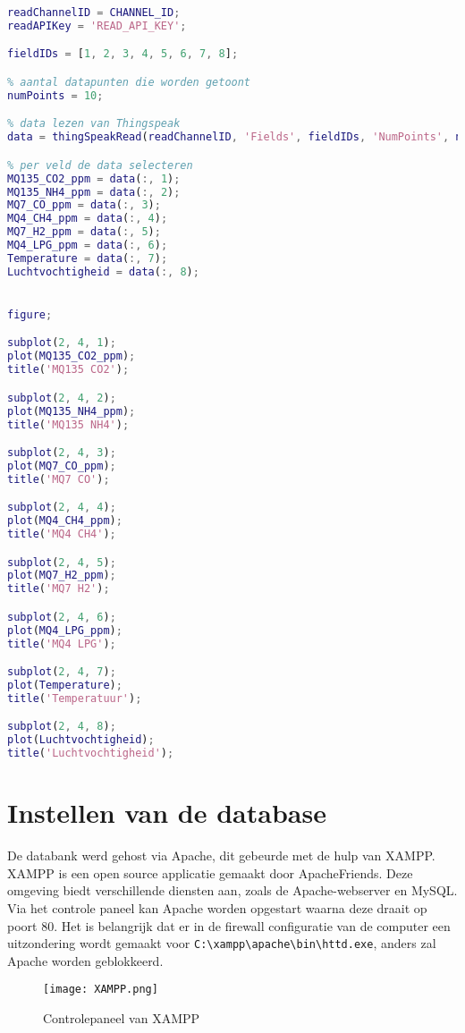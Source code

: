 \begin{lstlisting}[language=Matlab,caption={Visualisatie in matlab}]
readChannelID = CHANNEL_ID;
readAPIKey = 'READ_API_KEY';

fieldIDs = [1, 2, 3, 4, 5, 6, 7, 8];

% aantal datapunten die worden getoont
numPoints = 10;

% data lezen van Thingspeak
data = thingSpeakRead(readChannelID, 'Fields', fieldIDs, 'NumPoints', numPoints, 'ReadKey', readAPIKey);

% per veld de data selecteren
MQ135_CO2_ppm = data(:, 1);
MQ135_NH4_ppm = data(:, 2);
MQ7_CO_ppm = data(:, 3);
MQ4_CH4_ppm = data(:, 4);
MQ7_H2_ppm = data(:, 5);
MQ4_LPG_ppm = data(:, 6);
Temperature = data(:, 7);
Luchtvochtigheid = data(:, 8);


figure;

subplot(2, 4, 1);
plot(MQ135_CO2_ppm);
title('MQ135 CO2');

subplot(2, 4, 2);
plot(MQ135_NH4_ppm);
title('MQ135 NH4');

subplot(2, 4, 3);
plot(MQ7_CO_ppm);
title('MQ7 CO');

subplot(2, 4, 4);
plot(MQ4_CH4_ppm);
title('MQ4 CH4');

subplot(2, 4, 5);
plot(MQ7_H2_ppm);
title('MQ7 H2');

subplot(2, 4, 6);
plot(MQ4_LPG_ppm);
title('MQ4 LPG');

subplot(2, 4, 7);
plot(Temperature);
title('Temperatuur');

subplot(2, 4, 8);
plot(Luchtvochtigheid);
title('Luchtvochtigheid');

\end{lstlisting}


\section{Instellen van de database}
\label{sec:database}

De databank werd gehost via Apache, dit gebeurde met de hulp van XAMPP. XAMPP is een open source applicatie gemaakt door ApacheFriends. Deze omgeving biedt verschillende diensten aan, zoals de Apache-webserver en MySQL. Via het controle paneel kan Apache worden opgestart waarna deze draait op poort 80. Het is belangrijk dat er in de firewall configuratie van de computer een uitzondering wordt gemaakt voor \verb|C:\xampp\apache\bin\httd.exe|, anders zal Apache worden geblokkeerd.

\begin{figure}[h]
    \texttt{[image: XAMPP.png]}
    \caption[XAMPP controlepaneel]{Controlepaneel van XAMPP}
    \label{fig:XAMPP}
\end{figure}

